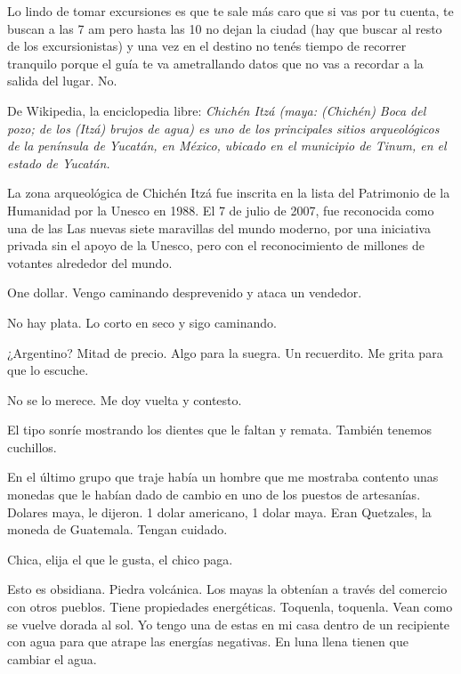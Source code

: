 \documentclass[11pt,twoside,openright,a6paper]{book}
\begin{document}
Lo lindo de tomar excursiones es que te sale más caro que si vas por tu cuenta, te buscan a las 7 am pero hasta las 10 no dejan la ciudad (hay que buscar al resto de los excursionistas) y una vez en el destino no tenés tiempo de recorrer tranquilo porque el guía te va ametrallando datos que no vas a recordar a la salida del lugar. No.

\vspace{0.5cm}

De Wikipedia, la enciclopedia libre: \emph{Chichén Itzá (maya: (Chichén) Boca del pozo; de los (Itzá) brujos de agua) es uno de los principales sitios arqueológicos de la península de Yucatán, en México, ubicado en el municipio de Tinum, en el estado de Yucatán.}

\vspace{0.5cm}

La zona arqueológica de Chichén Itzá fue inscrita en la lista del Patrimonio de la Humanidad por la Unesco en 1988. El 7 de julio de 2007, fue reconocida como una de las Las nuevas siete maravillas del mundo moderno, por una iniciativa privada sin el apoyo de la Unesco, pero con el reconocimiento de millones de votantes alrededor del mundo.

\vspace{0.5cm}

One dollar. Vengo caminando desprevenido y ataca un vendedor.

No hay plata. Lo corto en seco y sigo caminando.

¿Argentino? Mitad de precio. Algo para la suegra. Un recuerdito. Me grita para que lo escuche.

No se lo merece. Me doy vuelta y contesto.

El tipo sonríe mostrando los dientes que le faltan y remata. También tenemos cuchillos.

\vspace{0.5cm}

En el último grupo que traje había un hombre que me mostraba contento unas monedas que le habían dado de cambio en uno de los puestos de artesanías. Dolares maya, le dijeron. 1 dolar americano, 1 dolar maya. Eran Quetzales, la moneda de Guatemala. Tengan cuidado.

\vspace{0.5cm}

Chica, elija el que le gusta, el chico paga.

\vspace{0.5cm}

Esto es obsidiana. Piedra volcánica. Los mayas la obtenían a través del comercio con otros pueblos. Tiene propiedades energéticas. Toquenla, toquenla. Vean como se vuelve dorada al sol. Yo tengo una de estas en mi casa dentro de un recipiente con agua para que atrape las energías negativas. En luna llena tienen que cambiar el agua.
\end{document}
